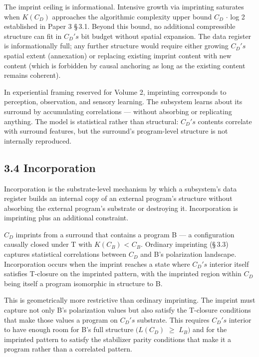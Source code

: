 \documentclass[11pt,oneside]{report}
\theoremstyle{definition}
\theoremstyle{remark}
\begin{document}
The imprint ceiling is informational. Intensive growth via imprinting
saturates when \ensuremath{K(C_{D})} approaches the algorithmic complexity upper bound
\textbar \ensuremath{C_{D}}\textbar{} \ensuremath{\cdot} log 2 established in Paper 3 \S\,3.1. Beyond this
bound, no additional compressible structure can fit in \ensuremath{C_{D}'s} bit budget
without spatial expansion. The data register is informationally full;
any further structure would require either growing \ensuremath{C_{D}'s} spatial extent
(annexation) or replacing existing imprint content with new content
(which is forbidden by causal anchoring as long as the existing content
remains coherent).

In experiential framing reserved for Volume 2, imprinting corresponds to
perception, observation, and sensory learning. The subsystem learns
about its surround by accumulating correlations --- without absorbing or
replicating anything. The model is statistical rather than structural:
\ensuremath{C_{D}'s} contents correlate with surround features, but the surround's
program-level structure is not internally reproduced.

\subsection*{3.4 Incorporation}

Incorporation is the substrate-level mechanism by which a subsystem's
data register builds an internal copy of an external program's structure
without absorbing the external program's substrate or destroying it.
Incorporation is imprinting plus an additional constraint.

\ensuremath{C_{D}} imprints from a surround that contains a program B --- a
configuration causally closed under T with \ensuremath{K(C_{B})} \textless{}
\textbar \ensuremath{C_{B}}\textbar. Ordinary imprinting (\S\,3.3) captures statistical
correlations between \ensuremath{C_{D}} and B's polarization landscape. Incorporation
occurs when the imprint reaches a state where \ensuremath{C_{D}'s} interior itself
satisfies T-closure on the imprinted pattern, with the imprinted region
within \ensuremath{C_{D}} being itself a program isomorphic in structure to B.

This is geometrically more restrictive than ordinary imprinting. The
imprint must capture not only B's polarization values but also satisfy
the T-closure conditions that make those values a program on \ensuremath{C_{D}'s}
substrate. This requires \ensuremath{C_{D}'s} interior to have enough room for B's
full structure \ensuremath{(L(C_{D})} \ensuremath{\geq} \ensuremath{L_{B})} and for the imprinted pattern to
satisfy the stabilizer parity conditions that make it a program rather
than a correlated pattern.
\end{document}
